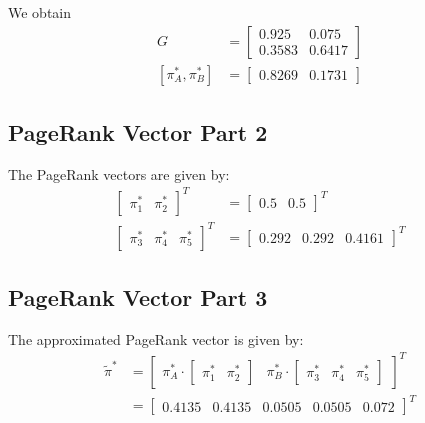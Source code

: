 \documentclass[]{article}
\begin{document}
We obtain
\begin{align*}
	G &= 
	\begin{bmatrix}
		0.925 & 0.075 \\
		0.3583 & 0.6417
	\end{bmatrix} \\
	[\pi_A^*, \pi_B^* ] &= 
	\begin{bmatrix}
		0.8269 & 0.1731
	\end{bmatrix}
\end{align*}

\subsection{PageRank Vector Part 2}

The PageRank vectors are given by:
\begin{align*}
	\begin{bmatrix}
		\pi_1^* & \pi_2^*
	\end{bmatrix}^T 
	&=
	\begin{bmatrix}
		0.5 & 0.5
	\end{bmatrix}^T 
	\\
	\begin{bmatrix}
		\pi_3^* & \pi_4^* & \pi_5^*
	\end{bmatrix}^T 
	&=
	\begin{bmatrix}
		0.292 & 0.292 & 0.4161
	\end{bmatrix}^T 
\end{align*}

\subsection{PageRank Vector Part 3}

The approximated PageRank vector is given by:
\begin{align*}
	\tilde{\pi}^* &= \begin{bmatrix}
		\pi^*_A \cdot \begin{bmatrix}
			\pi_1^* & \pi_2^*
		\end{bmatrix}
		&
		\pi^*_B \cdot \begin{bmatrix}
			\pi_3^* & \pi_4^* & \pi_5^*
		\end{bmatrix} 
	\end{bmatrix}^T 
	\\
	&= \begin{bmatrix}
	0.4135 & 0.4135 & 0.0505 & 0.0505 & 0.072
	\end{bmatrix}^T 
\end{align*}
\end{document}
